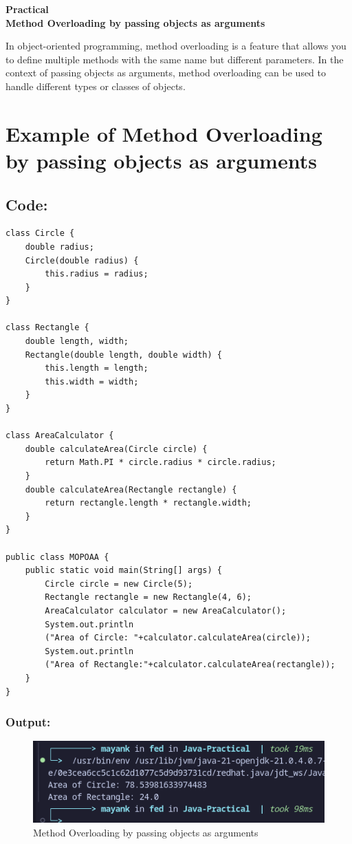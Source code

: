 \documentclass[a4paper,12pt]{article}
\newcounter{practicalno} %
\newcommand{\practicaltitle}[1]{
    \stepcounter{practicalno} %
    \newpage
    \begin{center}
        \vspace{1cm}
        \Large\textbf{Practical \thepracticalno} \\
        \vspace{0.5cm}
        \Large\textbf{#1} %
        \normalsize\vspace{1cm}
    \end{center}
}
\begin{document}
\setcounter{section}{0}

\practicaltitle{Method Overloading by passing objects as arguments}
In object-oriented programming, method overloading is a feature that allows you to define multiple methods with the same name but different parameters. In the context of passing objects as arguments, method overloading can be used to handle different types or classes of objects.

\section{Example of Method Overloading by passing objects as arguments}
\subsection{Code: }
\begin{lstlisting}
class Circle {
    double radius;
    Circle(double radius) {
        this.radius = radius;
    }
}

class Rectangle {
    double length, width;
    Rectangle(double length, double width) {
        this.length = length;
        this.width = width;
    }
}

class AreaCalculator {
    double calculateArea(Circle circle) {
        return Math.PI * circle.radius * circle.radius;
    }
    double calculateArea(Rectangle rectangle) {
        return rectangle.length * rectangle.width;
    }
}

public class MOPOAA {
    public static void main(String[] args) {
        Circle circle = new Circle(5);
        Rectangle rectangle = new Rectangle(4, 6);
        AreaCalculator calculator = new AreaCalculator();
        System.out.println
        ("Area of Circle: "+calculator.calculateArea(circle));
        System.out.println
        ("Area of Rectangle:"+calculator.calculateArea(rectangle));
    }
}    
\end{lstlisting}
\subsubsection{Output: }
\begin{figure}[H]
    \centering
    \includegraphics[width=0.9\linewidth]{images/MOPOAA.png}
    \caption{Method Overloading by passing objects as arguments}
    \label{fig:sample_image}
\end{figure}
\end{document}
